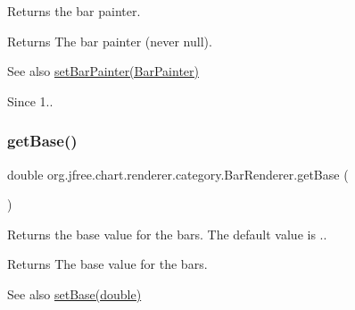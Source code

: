 Returns the bar painter.

\begin{DoxyReturn}{Returns}
The bar painter (never {\ttfamily null}).
\end{DoxyReturn}
\begin{DoxySeeAlso}{See also}
\mbox{\hyperlink{classorg_1_1jfree_1_1chart_1_1renderer_1_1category_1_1_bar_renderer_a7078d6a2ff8aebd78b2be65c4d9a8491}{set\+Bar\+Painter(\+Bar\+Painter)}}
\end{DoxySeeAlso}
\begin{DoxySince}{Since}
1.. 
\end{DoxySince}
\mbox{\label{classorg_1_1jfree_1_1chart_1_1renderer_1_1category_1_1_bar_renderer_ac6046a96ca5f1da74dc46393ad19a866}} 
\subsubsection{\texorpdfstring{get\+Base()}{getBase()}}
{\footnotesize\ttfamily double org.\+jfree.\+chart.\+renderer.\+category.\+Bar\+Renderer.\+get\+Base (\begin{DoxyParamCaption}{ }\end{DoxyParamCaption})}

Returns the base value for the bars. The default value is {.}.

\begin{DoxyReturn}{Returns}
The base value for the bars.
\end{DoxyReturn}
\begin{DoxySeeAlso}{See also}
\mbox{\hyperlink{classorg_1_1jfree_1_1chart_1_1renderer_1_1category_1_1_bar_renderer_af998b6dafee9431ff2ec95422d0d5e4f}{set\+Base(double)}} 
\end{DoxySeeAlso}
\mbox{\label{classorg_1_1jfree_1_1chart_1_1renderer_1_1category_1_1_bar_renderer_af2dd1659f4be5ee58d38e592f086073c}} 

